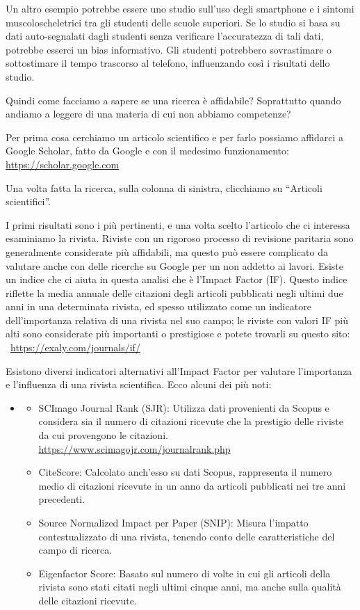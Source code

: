\documentclass[12pt]{book} %
\begin{document}
Un altro esempio potrebbe essere uno studio sull'uso degli smartphone e i sintomi
muscoloscheletrici tra gli studenti delle scuole superiori. Se lo studio si basa su dati auto-segnalati dagli studenti
senza verificare l'accuratezza di tali dati, potrebbe esserci un bias informativo. Gli studenti
potrebbero sovrastimare o sottostimare il tempo trascorso al telefono, influenzando così i risultati dello studio.

Quindi come facciamo a sapere se una ricerca è affidabile? Soprattutto quando andiamo a leggere di una materia di cui
non abbiamo competenze?

Per prima cosa cerchiamo un articolo scientifico e per farlo possiamo affidarci a Google Scholar, fatto da Google e con
il medesimo funzionamento: \protect\url{https://scholar.google.com}

Una volta fatta la ricerca, sulla colonna di sinistra, clicchiamo su “Articoli scientifici”.

I primi risultati sono i più pertinenti, e una volta scelto l'articolo che ci interessa esaminiamo
la rivista. Riviste con un rigoroso processo di revisione paritaria sono generalmente considerate più affidabili, ma
questo può essere complicato da valutare anche con delle ricerche su Google per un non addetto ai lavori. Esiste un
indice che ci aiuta in questa analisi che è l'Impact Factor (IF). Questo indice riflette la media
annuale delle citazioni degli articoli pubblicati negli ultimi due anni in una determinata rivista, ed spesso
utilizzato come un indicatore dell'importanza relativa di una rivista nel suo campo; le riviste
con valori IF più alti sono considerate più importanti o prestigiose e potete trovarli su questo sito:
\ \protect\url{https://exaly.com/journals/if/}

Esistono diversi indicatori alternativi all'Impact Factor per valutare l'importanza e l'influenza di una rivista
scientifica. Ecco alcuni dei più noti:

\begin{itemize}
\item \begin{itemize}
\item SCImago Journal Rank (SJR): Utilizza dati provenienti da Scopus e considera sia il numero di citazioni ricevute
che la prestigio delle riviste da cui provengono le citazioni. \protect\url{https://www.scimagojr.com/journalrank.php} 
\item CiteScore: Calcolato anch'esso su dati Scopus, rappresenta il numero medio di citazioni ricevute in un anno da
articoli pubblicati nei tre anni precedenti.
\item Source Normalized Impact per Paper (SNIP): Misura l'impatto contestualizzato di una rivista, tenendo conto delle
caratteristiche del campo di ricerca.
\item Eigenfactor Score: Basato sul numero di volte in cui gli articoli della rivista sono stati citati negli ultimi
cinque anni, ma anche sulla {\textquotedbl}qualità{\textquotedbl} delle citazioni ricevute.
\end{itemize}
\end{itemize}
\end{document}
